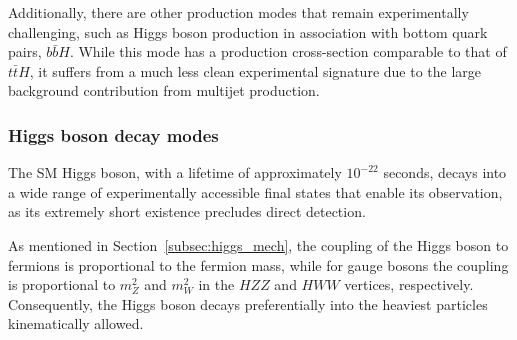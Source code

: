 Additionally, there are other production modes that remain experimentally challenging, such as Higgs boson production in association with bottom quark pairs, \( b\bar{b}H \). While this mode has a production cross-section comparable to that of \( t\bar{t}H \), it suffers from a much less clean experimental signature due to the large background contribution from multijet production.

\subsubsection*{Higgs boson decay modes}
\label{sec:higgs_decay}

The SM Higgs boson, with a lifetime of approximately \(10^{-22}\) seconds, decays into a wide range of experimentally accessible final states that enable its observation, as its extremely short existence precludes direct detection.

As mentioned in Section~\ref{subsec:higgs_mech}, the coupling of the Higgs boson to fermions is proportional to the fermion mass, while for gauge bosons the coupling is proportional to \(m_Z^2\) and \(m_W^2\) in the \(HZZ\) and \(HWW\) vertices, respectively. Consequently, the Higgs boson decays preferentially into the heaviest particles kinematically allowed.

